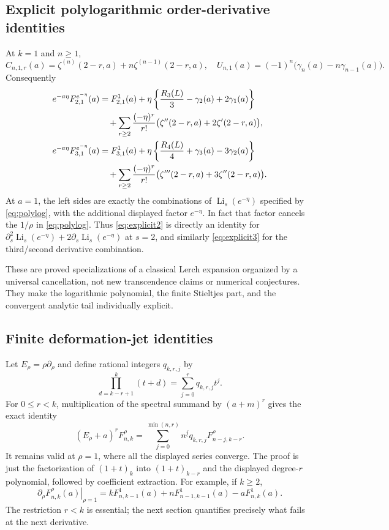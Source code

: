\documentclass[11pt,letterpaper]{article}
\numberwithin{equation}{section}
\theoremstyle{definition}\newtheorem{definition}[theorem]{Definition}
\theoremstyle{remark}\newtheorem{remark}[theorem]{Remark}
\DeclareMathOperator{\Li}{Li}
\newcommand{\F}[3]{F_{#1,#2}^{#3}}
\newcommand{\fall}[2]{#1^{\underline{#2}}}
\begin{document}
\subsection{Explicit polylogarithmic order-derivative identities}
At $k=1$ and $n\ge1$,
\[
 C_{n,1,r}(a)=\zeta^{(n)}(2-r,a)+n\zeta^{(n-1)}(2-r,a),
 \quad U_{n,1}(a)=(-1)^n\bigl(\gamma_n(a)-n\gamma_{n-1}(a)\bigr).
\]
Consequently
\begin{align}
 e^{-a\eta}\F21{e^{-\eta}}(a)
 &=\F21{1}(a)
 +\eta\left\{\frac{R_3(L)}3-\gamma_2(a)+2\gamma_1(a)\right\}\notag\\
 &\quad+\sum_{r\ge2}\frac{(-\eta)^r}{r!}
  \bigl(\zeta''(2-r,a)+2\zeta'(2-r,a)\bigr),\label{eq:explicit2}\\
 e^{-a\eta}\F31{e^{-\eta}}(a)
 &=\F31{1}(a)
 +\eta\left\{\frac{R_4(L)}4+\gamma_3(a)-3\gamma_2(a)\right\}\notag\\
 &\quad+\sum_{r\ge2}\frac{(-\eta)^r}{r!}
  \bigl(\zeta'''(2-r,a)+3\zeta''(2-r,a)\bigr).\label{eq:explicit3}
\end{align}
At $a=1$, the left sides are exactly the combinations of $\Li_s(e^{-\eta})$ specified by \eqref{eq:polylog}, with the additional displayed factor $e^{-\eta}$. In fact that factor cancels the $1/\rho$ in \eqref{eq:polylog}. Thus \eqref{eq:explicit2} is directly an identity for
$\partial_s^2\Li_s(e^{-\eta})+2\partial_s\Li_s(e^{-\eta})$ at $s=2$, and similarly \eqref{eq:explicit3} for the third/second derivative combination.

These are proved specializations of a classical Lerch expansion organized by a universal cancellation, not new transcendence claims or numerical conjectures. They make the logarithmic polynomial, the finite Stieltjes part, and the convergent analytic tail individually explicit.

\subsection{Finite deformation-jet identities}
Let $E_\rho=\rho\partial_\rho$ and define rational integers $q_{k,r,j}$ by
\[
 \prod_{d=k-r+1}^{k}(t+d)=\sum_{j=0}^{r}q_{k,r,j}t^j.
\]
For $0\le r<k$, multiplication of the spectral summand by $(a+m)^r$ gives the exact identity
\begin{equation}\label{eq:jet}
 (E_\rho+a)^r\F nk\rho
 =\sum_{j=0}^{\min(n,r)}\fall nj q_{k,r,j}\F {n-j}{k-r}\rho.
\end{equation}
It remains valid at $\rho=1$, where all the displayed series converge. The proof is just the factorization of $(1+t)_k$ into $(1+t)_{k-r}$ and the displayed degree-$r$ polynomial, followed by coefficient extraction. For example, if $k\ge2$,
\begin{equation}\label{eq:firstjet}
 \left.\partial_\rho\F nk\rho(a)\right|_{\rho=1}
 =k\F n{k-1}1(a)+n\F {n-1}{k-1}1(a)-a\F nk1(a).
\end{equation}
The restriction $r<k$ is essential; the next section quantifies precisely what fails at the next derivative.
\end{document}
